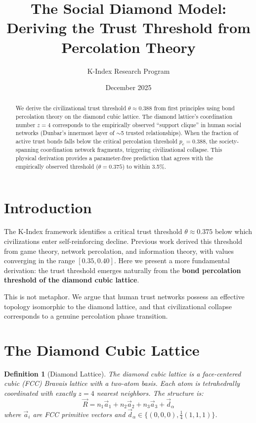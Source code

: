 \documentclass[11pt]{article}
\title{The Social Diamond Model:\\
Deriving the Trust Threshold from Percolation Theory}
\author{K-Index Research Program}
\date{December 2025}
\newtheorem{definition}{Definition}
\begin{document}
\maketitle

\begin{abstract}
We derive the civilizational trust threshold $\theta \approx 0.388$ from first principles using bond percolation theory on the diamond cubic lattice. The diamond lattice's coordination number $z=4$ corresponds to the empirically observed ``support clique'' in human social networks (Dunbar's innermost layer of $\sim$5 trusted relationships). When the fraction of active trust bonds falls below the critical percolation threshold $p_c = 0.388$, the society-spanning coordination network fragments, triggering civilizational collapse. This physical derivation provides a parameter-free prediction that agrees with the empirically observed threshold ($\theta = 0.375$) to within 3.5\%.
\end{abstract}

\section{Introduction}

The K-Index framework identifies a critical trust threshold $\theta \approx 0.375$ below which civilizations enter self-reinforcing decline. Previous work derived this threshold from game theory, network percolation, and information theory, with values converging in the range $[0.35, 0.40]$. Here we present a more fundamental derivation: the trust threshold emerges naturally from the \textbf{bond percolation threshold of the diamond cubic lattice}.

This is not metaphor. We argue that human trust networks possess an effective topology isomorphic to the diamond lattice, and that civilizational collapse corresponds to a genuine percolation phase transition.

\section{The Diamond Cubic Lattice}

\begin{definition}[Diamond Lattice]
The diamond cubic lattice is a face-centered cubic (FCC) Bravais lattice with a two-atom basis. Each atom is tetrahedrally coordinated with exactly $z = 4$ nearest neighbors. The structure is:
\begin{equation}
\vec{R} = n_1 \vec{a}_1 + n_2 \vec{a}_2 + n_3 \vec{a}_3 + \vec{d}_\alpha
\end{equation}
where $\vec{a}_i$ are FCC primitive vectors and $\vec{d}_\alpha \in \{(0,0,0), \frac{1}{4}(1,1,1)\}$.
\end{definition}
\end{document}
